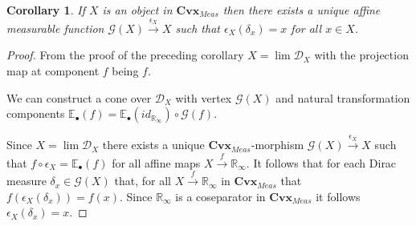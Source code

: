 \documentclass[11pt]{amsart}    %
\newtheorem{corollary}{Corollary}
\newcommand{\Rinf}{\mathbb{R}_{\infty}}
\newcommand{\G}{\mathcal{G}}
\begin{document}

\begin{corollary} If $X$ is an object in $\mathbf{Cvx}_{Meas}$ then there exists a unique affine measurable function $\G(X) \xrightarrow{\epsilon_X} X$ such that $\epsilon_X(\delta_x)=x$ for all $x \in X$. 
\end{corollary}
\begin{proof}  From the proof of the preceding corollary 
$X = \lim \mathcal{D}_X$ with the projection map at component $f$ being $f$. 

We can construct a cone over $\mathcal{D}_X$ with vertex $\G(X)$ and natural transformation components $\mathbb{E}_{\bullet}(f) = \mathbb{E}_{\bullet}(id_{\mathbb{R}_{\infty}}) \circ \G(f)$.
\begin{center}
\end{center}

Since $X=\lim \mathcal{D}_X$ there exists a unique $\mathbf{Cvx}_{Meas}$-morphism   $\G(X) \xrightarrow{\epsilon_X} X$ such that $f \circ \epsilon_X = \mathbb{E}_{\bullet}(f)$ for all affine maps $X \xrightarrow{f} \mathbb{R}_{\infty}$. It follows that for each Dirac measure $\delta_x \in \G(X)$ that, for all $X \xrightarrow{f} \mathbb{R}_{\infty}$ in $\mathbf{Cvx}_{Meas}$ that $f(\epsilon_X(\delta_x)) = f(x)$.  Since $\mathbb{R}_{\infty}$ is a coseparator in $\mathbf{Cvx}_{Meas}$ it follows $\epsilon_X(\delta_x)=x$.
\end{proof}
\end{document}
